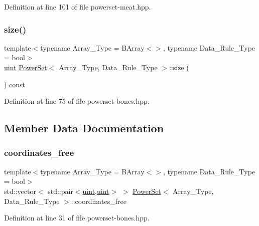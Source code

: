 Definition at line 101 of file powerset-\/meat.\+hpp.

\mbox{\label{class_power_set_a80e7099e115369326e6c873a92d270f9}} 
\subsubsection{\texorpdfstring{size()}{size()}}
{\footnotesize\ttfamily template$<$typename Array\+\_\+\+Type  = B\+Array$<$$>$, typename Data\+\_\+\+Rule\+\_\+\+Type  = bool$>$ \\
\hyperlink{typedefs_8hpp_a91ad9478d81a7aaf2593e8d9c3d06a14}{uint} \hyperlink{class_power_set}{Power\+Set}$<$ Array\+\_\+\+Type, Data\+\_\+\+Rule\+\_\+\+Type $>$\+::size (\begin{DoxyParamCaption}{ }\end{DoxyParamCaption}) const\hspace{0.3cm}{\ttfamily [inline]}}



Definition at line 75 of file powerset-\/bones.\+hpp.



\subsection{Member Data Documentation}
\mbox{\label{class_power_set_a99cfef97c3a457ea7be1b000b39f41d9}} 
\subsubsection{\texorpdfstring{coordinates\+\_\+free}{coordinates\_free}}
{\footnotesize\ttfamily template$<$typename Array\+\_\+\+Type  = B\+Array$<$$>$, typename Data\+\_\+\+Rule\+\_\+\+Type  = bool$>$ \\
std\+::vector$<$ std\+::pair$<$\hyperlink{typedefs_8hpp_a91ad9478d81a7aaf2593e8d9c3d06a14}{uint},\hyperlink{typedefs_8hpp_a91ad9478d81a7aaf2593e8d9c3d06a14}{uint}$>$ $>$ \hyperlink{class_power_set}{Power\+Set}$<$ Array\+\_\+\+Type, Data\+\_\+\+Rule\+\_\+\+Type $>$\+::coordinates\+\_\+free}



Definition at line 31 of file powerset-\/bones.\+hpp.

